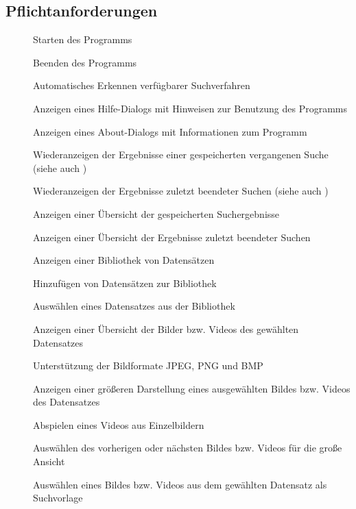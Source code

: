 \subsection{Pflichtanforderungen}
\begin{description}
	\item[] Starten des Programms
	\item[] Beenden des Programms
	\item[] Automatisches Erkennen verfügbarer Suchverfahren
	\item[] Anzeigen eines Hilfe-Dialogs mit Hinweisen zur Benutzung des Programms
	\item[] Anzeigen eines About-Dialogs mit Informationen zum Programm
	\newline
	\item[] Wiederanzeigen der Ergebnisse einer gespeicherten vergangenen Suche (siehe auch )
	\item[] Wiederanzeigen der Ergebnisse zuletzt beendeter Suchen (siehe auch )
	\item[] Anzeigen einer Übersicht der gespeicherten Suchergebnisse
	\item[] Anzeigen einer Übersicht der Ergebnisse zuletzt beendeter Suchen
	\item[] Anzeigen einer Bibliothek von Datensätzen
	\item[] Hinzufügen von Datensätzen zur Bibliothek
	\item[] Ausw\"ahlen eines Datensatzes aus der Bibliothek
	\item[] Anzeigen einer Übersicht der Bilder bzw. Videos des gewählten Datensatzes
	\item[] Unterstützung der Bildformate JPEG, PNG und BMP
	\item[] Anzeigen einer größeren Darstellung eines ausgewählten Bildes bzw. Videos des Datensatzes
	\item[] Abspielen eines Videos aus Einzelbildern
	\item[] Auswählen des vorherigen oder nächsten Bildes bzw. Videos für die große Ansicht %
	\item[] Ausw\"ahlen eines Bildes bzw. Videos aus dem gewählten Datensatz als Suchvorlage

\end{description}

